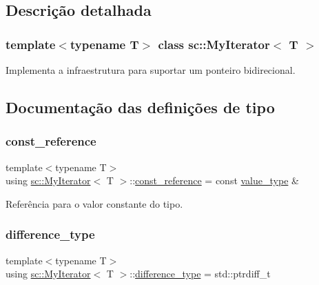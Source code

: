 \subsection{Descrição detalhada}
\subsubsection*{template$<$typename T$>$\newline
class sc\+::\+My\+Iterator$<$ T $>$}

Implementa a infraestrutura para suportar um ponteiro bidirecional. 

\subsection{Documentação das definições de tipo}
\mbox{\label{classsc_1_1MyIterator_ad8f5e1835e5247b500a08297a4f79a3c}} 
\subsubsection{\texorpdfstring{const\+\_\+reference}{const\_reference}}
{\footnotesize\ttfamily template$<$typename T$>$ \\
using \hyperlink{classsc_1_1MyIterator}{sc\+::\+My\+Iterator}$<$ T $>$\+::\hyperlink{classsc_1_1MyIterator_ad8f5e1835e5247b500a08297a4f79a3c}{const\+\_\+reference} =  const \hyperlink{classsc_1_1MyIterator_a87259a3ccf8ff488d496b658324c4b2d}{value\+\_\+type} \&}



Referência para o valor constante do tipo. 

\mbox{\label{classsc_1_1MyIterator_ab37e30d9d7abaca8b7ed9c4ba7371798}} 
\subsubsection{\texorpdfstring{difference\+\_\+type}{difference\_type}}
{\footnotesize\ttfamily template$<$typename T$>$ \\
using \hyperlink{classsc_1_1MyIterator}{sc\+::\+My\+Iterator}$<$ T $>$\+::\hyperlink{classsc_1_1MyIterator_ab37e30d9d7abaca8b7ed9c4ba7371798}{difference\+\_\+type} =  std\+::ptrdiff\+\_\+t}




